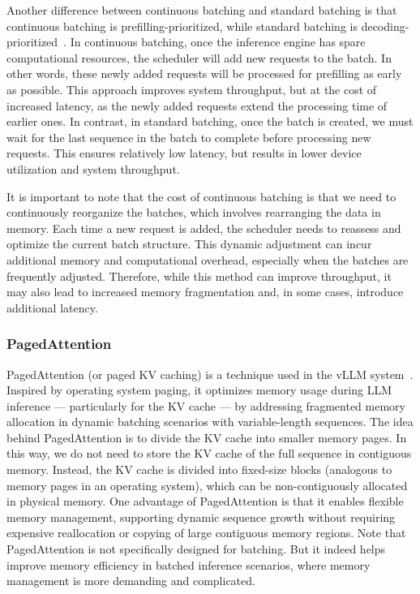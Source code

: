 Another difference between continuous batching and standard batching is that continuous batching is prefilling-prioritized, while standard batching is decoding-prioritized~\cite{agrawal-etal:2024taming}. In continuous batching, once the inference engine has spare computational resources, the scheduler will add new requests to the batch. In other words, these newly added requests will be processed for prefilling as early as possible. This approach improves system throughput, but at the cost of increased latency, as the newly added requests extend the processing time of earlier ones. In contrast, in standard batching, once the batch is created, we must wait for the last sequence in the batch to complete before processing new requests. This ensures relatively low latency, but results in lower device utilization and system throughput.

It is important to note that the cost of continuous batching is that we need to continuously reorganize the batches, which involves rearranging the data in memory. Each time a new request is added, the scheduler needs to reassess and optimize the current batch structure. This dynamic adjustment can incur additional memory and computational overhead, especially when the batches are frequently adjusted. Therefore, while this method can improve throughput, it may also lead to increased memory fragmentation and, in some cases, introduce additional latency.

\subsubsection{PagedAttention}


PagedAttention (or paged KV caching) is a technique used in the vLLM system~\cite{kwon-etal:2023efficient}. Inspired by operating system paging, it optimizes memory usage during LLM inference --- particularly for the KV cache --- by addressing fragmented memory allocation in dynamic batching scenarios with variable-length sequences. The idea behind PagedAttention is to divide the KV cache into smaller memory pages. In this way, we do not need to store the KV cache of the full sequence in contiguous memory. Instead, the KV cache is divided into fixed-size blocks (analogous to memory pages in an operating system), which can be non-contiguously allocated in physical memory. One advantage of PagedAttention is that it enables flexible memory management, supporting dynamic sequence growth without requiring expensive reallocation or copying of large contiguous memory regions. Note that PagedAttention is not specifically designed for batching. But it indeed helps improve memory efficiency in batched inference scenarios, where memory management is more demanding and complicated.

